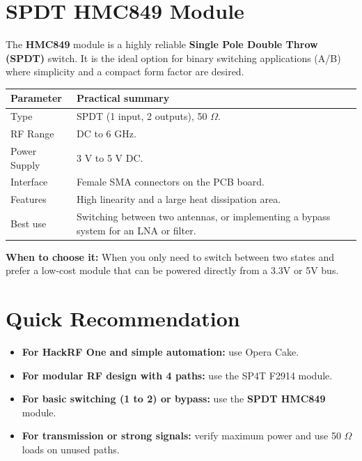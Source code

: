 \documentclass[11pt]{article}
\begin{document}
\section{SPDT HMC849 Module}

The \textbf{HMC849} module is a highly reliable \textbf{Single Pole Double Throw (SPDT)} switch. It is the ideal option for binary switching applications (A/B) where simplicity and a compact form factor are desired.

\begin{table}[h]
    \centering
    \small
    \begin{tabular}{p{}p{}}
        \toprule
        \textbf{Parameter} & \textbf{Practical summary} \\
        \midrule
        Type & SPDT (1 input, 2 outputs), 50 $\Omega$. \\
        RF Range & DC to 6 GHz. \\
        Power Supply & 3 V to 5 V DC. \\
        Interface & Female SMA connectors on the PCB board. \\
        Features & High linearity and a large heat dissipation area. \\
        Best use & Switching between two antennas, or implementing a bypass system for an LNA or filter. \\
        \bottomrule
    \end{tabular}
\end{table}

\textbf{When to choose it:} When you only need to switch between two states and prefer a low-cost module that can be powered directly from a 3.3V or 5V bus.

\section{Quick Recommendation}

\begin{itemize}
    \item \textbf{For HackRF One and simple automation:} use Opera Cake.
    \item \textbf{For modular RF design with 4 paths:} use the SP4T F2914 module.
    \item \textbf{For basic switching (1 to 2) or bypass:} use the \textbf{SPDT HMC849} module.
    \item \textbf{For transmission or strong signals:} verify maximum power and use 50 $\Omega$ loads on unused paths.
\end{itemize}
\end{document}
